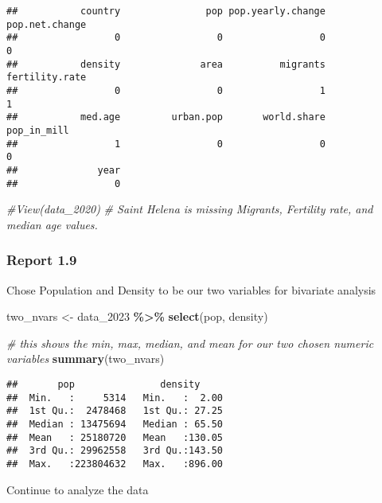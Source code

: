 \documentclass[
]{article}
\newenvironment{Shaded}{\begin{snugshade}}{\end{snugshade}}
\newcommand{\CommentTok}[1]{\textcolor[rgb]{0.56,0.35,0.01}{\textit{#1}}}
\newcommand{\FunctionTok}[1]{\textcolor[rgb]{0.13,0.29,0.53}{\textbf{#1}}}
\newcommand{\NormalTok}[1]{#1}
\newcommand{\OtherTok}[1]{\textcolor[rgb]{0.56,0.35,0.01}{#1}}
\newcommand{\SpecialCharTok}[1]{\textcolor[rgb]{0.81,0.36,0.00}{\textbf{#1}}}
\begin{document}
\begin{verbatim}
##           country               pop pop.yearly.change    pop.net.change 
##                 0                 0                 0                 0 
##           density              area          migrants    fertility.rate 
##                 0                 0                 1                 1 
##           med.age         urban.pop       world.share       pop_in_mill 
##                 1                 0                 0                 0 
##              year 
##                 0
\end{verbatim}

\begin{Shaded}
\begin{Highlighting}[]
\CommentTok{\#View(data\_2020)}
\CommentTok{\# Saint Helena is missing Migrants, Fertility rate, and median age values.}
\end{Highlighting}
\end{Shaded}

\subsubsection{Report 1.9}\label{report-1.9}

Chose Population and Density to be our two variables for bivariate
analysis

\begin{Shaded}
\begin{Highlighting}[]
\NormalTok{two\_nvars }\OtherTok{\textless{}{-}}\NormalTok{ data\_2023 }\SpecialCharTok{\%\textgreater{}\%} 
  \FunctionTok{select}\NormalTok{(pop, density)}
 
\CommentTok{\# this shows the min, max, median, and mean for our two chosen numeric variables }
\FunctionTok{summary}\NormalTok{(two\_nvars)}
\end{Highlighting}
\end{Shaded}

\begin{verbatim}
##       pop               density      
##  Min.   :     5314   Min.   :  2.00  
##  1st Qu.:  2478468   1st Qu.: 27.25  
##  Median : 13475694   Median : 65.50  
##  Mean   : 25180720   Mean   :130.05  
##  3rd Qu.: 29962558   3rd Qu.:143.50  
##  Max.   :223804632   Max.   :896.00
\end{verbatim}

Continue to analyze the data

\begin{Shaded}
\end{Shaded}
\end{document}
